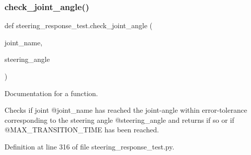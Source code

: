 \subsubsection{\texorpdfstring{check\_joint\_angle()}{check\_joint\_angle()}}
{\footnotesize\ttfamily def steering\+\_\+response\+\_\+test.\+check\+\_\+joint\+\_\+angle (\begin{DoxyParamCaption}\item[{}]{joint\+\_\+name,  }\item[{}]{steering\+\_\+angle }\end{DoxyParamCaption})}



Documentation for a function. 

Checks if joint @joint\+\_\+name has reached the joint-\/angle within error-\/tolerance corresponding to the steering angle @steering\+\_\+angle and returns if so or if @\+M\+A\+X\+\_\+\+T\+R\+A\+N\+S\+I\+T\+I\+O\+N\+\_\+\+T\+I\+ME has been reached. 

Definition at line 316 of file steering\+\_\+response\+\_\+test.\+py.



